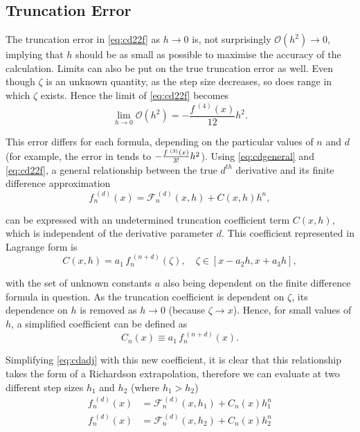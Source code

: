 \subsection{Truncation Error}\label{sec:truncerr}

The truncation error in \cref{eq:cd22f} as $h\!\to\!0$ is, not surprisingly $\mathcal{O}(h^2)\!\to\!0$, implying that $h$ should be as small as possible to maximise the accuracy of the calculation.
Limits can also be put on the true truncation error as well.
Even though $\zeta$ is an unknown quantity, as the step size decreases, so does range in which $\zeta$ exists.
Hence the limit of \cref{eq:cd22f} becomes
\begin{equation}
\lim_{h \to 0}\mathcal{O}(h^2) =  - \frac{f^{\;(4)}(x)}{12}h^2.
\end{equation}

This error differs for each formula, depending on the particular values of $n$ and $d$ (for example, the error in  tends to $\cramped{-\frac{f^{\;(3)}(x)}{3!}h^2}$).
Using \cref{eq:cdgeneral} and \cref{eq:cd22f}, a general relationship between the true $d^{th}$ derivative and its finite difference approximation
\begin{equation}
 f_n^{\;(d)}(x) = \mathcal{F}_n^{\,(d)}(x,h) + C(x,h)h^n,\label{eq:cdadj}
\end{equation}

can be expressed with an undetermined truncation coefficient term $C(x,h)$, which is independent of the derivative parameter $d$.
This coefficient represented in Lagrange form is
\begin{equation}
C(x,h) = a_1\,f_n^{\;(n+d)}(\zeta), \quad \zeta \in [x-a_2h,x+a_3h],\label{eq:cdcxh}
\end{equation}

with the set of unknown constants $a$ also being dependent on the finite difference formula in question.
As the truncation coefficient is dependent on $\zeta$, its dependence on $h$ is removed as $h\!\to\!0$ (because $\zeta\!\to\!x$).
Hence, for small values of $h$, a simplified coefficient can be defined as
\begin{equation}
 C_n(x) \equiv a_1\,f_n^{\;(n+d)}(x).
\end{equation}

Simplifying \cref{eq:cdadj} with this new coefficient, it is clear that this relationship takes the form of a Richardson extrapolation, therefore we can evaluate at two different step sizes $h_1$ and $h_2$ (where $h_1 > h_2$)
\begin{align}
f_n^{\;(d)}(x) &= \mathcal{F}_n^{\,(d)}(x,h_1) + C_n(x)h_1^n \\
f_n^{\;(d)}(x) &= \mathcal{F}_n^{\,(d)}(x,h_2) + C_n(x)h_2^n
\end{align}

